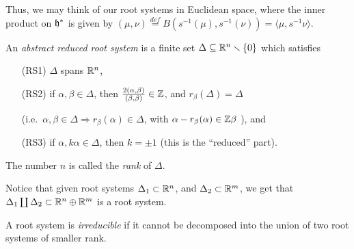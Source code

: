  Thus, we may think of our root systems in Euclidean space, where the inner
 product on $\mathfrak{h}^*$ is given by $(\mu,\nu)\stackrel{def}{=} B(s^{-1}(\mu),s^{-1}(\nu))
 = \langle \mu,s^{-1}\nu\rangle$.

 \begin{definition}
   An \emph{abstract reduced root system} is a finite set
   $\Delta\subseteq \mathbb{R}^n\smallsetminus\{0\}$ which satisfies
   \begin{itemize}
   \item[\hypertarget{RS1}{(RS1)}] $\Delta$ spans $\mathbb{R}^n$,%
   \item[\hypertarget{RS2}{(RS2)}] if $\alpha,\beta\in \Delta$, then
    $\frac{2(\alpha,\beta)}{(\beta,\beta)}\in \mathbb{Z}$, and $r_\beta(\Delta)=\Delta$%
   \item[](i.e.\ $\alpha,\beta\in \Delta \Rightarrow r_\beta(\alpha)\in \Delta$, with
   $\alpha-r_\beta(\alpha) \in \mathbb{Z} \beta$ ), and %
   \item[\hypertarget{RS3}{(RS3)}] if $\alpha,k\alpha\in \Delta$, then $k=\pm 1$ (this
        is the ``reduced'' part).%
   \end{itemize}
   The number $n$ is called the \emph{rank} of $\Delta$.
 \end{definition}
 Notice that given root systems $\Delta_1\subset \mathbb{R}^n$, and $\Delta_2\subset \mathbb{R}^m$, we
 get that $\Delta_1\coprod \Delta_2 \subset \mathbb{R}^n\oplus \mathbb{R}^m$ is a root system.
 \begin{definition}
   A root system is \emph{irreducible} if it cannot be
   decomposed into the union of two root systems of smaller rank.
 \end{definition}
